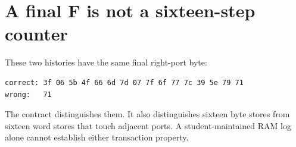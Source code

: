 \section{A final F is not a sixteen-step
  counter}\label{005-seven-segment-counter-x-trace-contract-a-final-f-is-not-a-sixteen-step-counter}

These two histories have the same final right-port byte:

\begin{verbatim}
correct: 3f 06 5b 4f 66 6d 7d 07 7f 6f 77 7c 39 5e 79 71
wrong:   71
\end{verbatim}

The contract distinguishes them. It also distinguishes sixteen byte
stores from sixteen word stores that touch adjacent ports. A
student-maintained RAM log alone cannot establish either transaction
property.
